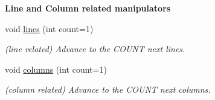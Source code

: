 \begin{Indent}{\bf Line and Column related manipulators}\par
\begin{DoxyCompactItemize}
\item 
void \hyperlink{classEquationParser_1_1position_aa8c98c7540a4e8da6bc0f4d029b1f8a5}{lines} (int count=1)\hypertarget{classEquationParser_1_1position_aa8c98c7540a4e8da6bc0f4d029b1f8a5}{}\label{classEquationParser_1_1position_aa8c98c7540a4e8da6bc0f4d029b1f8a5}

\begin{DoxyCompactList}\small\item\em (line related) Advance to the C\+O\+U\+NT next lines. \end{DoxyCompactList}\item 
void \hyperlink{classEquationParser_1_1position_a4e5d00a7adfd522555e43ecc42357ef0}{columns} (int count=1)\hypertarget{classEquationParser_1_1position_a4e5d00a7adfd522555e43ecc42357ef0}{}\label{classEquationParser_1_1position_a4e5d00a7adfd522555e43ecc42357ef0}

\begin{DoxyCompactList}\small\item\em (column related) Advance to the C\+O\+U\+NT next columns. \end{DoxyCompactList}\end{DoxyCompactItemize}
\end{Indent}
